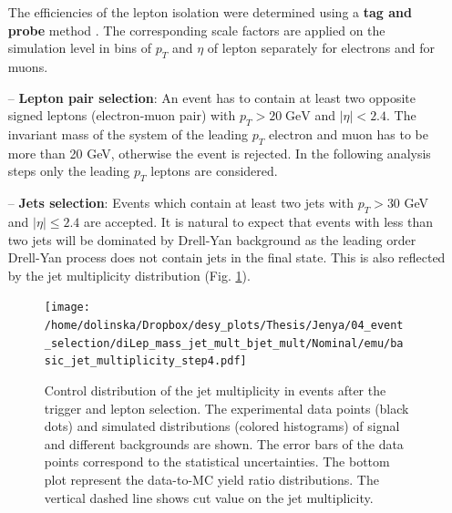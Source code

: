\begin{itemize}
 The efficiencies of the lepton isolation were determined using a \textbf{tag and probe} method \cite{TWikiTP}. The corresponding scale factors are applied on the
 simulation level in bins of $p_{T}$ and $\eta$ of lepton separately for electrons and for muons.
 \item [--] \textbf{Lepton pair selection}: An event has to contain at least two opposite signed leptons (electron-muon pair) with $p_{T} > 20 \; \textrm{GeV}$ and $|\eta| < 2.4$.
 The invariant mass of the system of the leading $p_{T}$ electron and muon has to be more than 20 GeV, otherwise the event is rejected. In the following analysis steps
 only the leading $p_{T}$ leptons are considered.
 \item [--] \textbf{Jets selection}: Events which contain at least two jets with $p_{T} > 30$ GeV and $|\eta| \leq 2.4$ are accepted. It is natural to expect
 that events with less than two jets will be dominated by Drell-Yan background as the leading order Drell-Yan process does not contain jets in the final state. This is also 
 reflected by the jet multiplicity distribution (Fig. \ref{fig:jetMultiSel}). 
 
 \begin{figure}[h]
  \centering
  \texttt{[image: /home/dolinska/Dropbox/desy\_plots/Thesis/Jenya/04\_event\_selection/diLep\_mass\_jet\_mult\_bjet\_mult/Nominal/emu/basic\_jet\_multiplicity\_step4.pdf]}
  \caption{Control distribution of the jet multiplicity in events after the trigger and lepton selection. The experimental data points (black dots)
  and simulated distributions (colored histograms) of signal and different backgrounds are shown. The error bars of the data points
 correspond to the statistical uncertainties. The bottom plot represent the data-to-MC yield ratio distributions. The vertical dashed line shows cut value on the jet multiplicity.}
  \label{fig:jetMultiSel}
 \end{figure}
 

\end{itemize}
